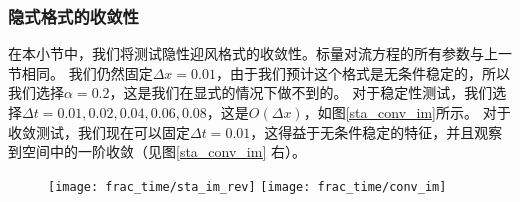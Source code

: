 \subsubsection{隐式格式的收敛性}

在本小节中，我们将测试隐性迎风格式的收敛性。标量对流方程的所有参数与上一节相同。 我们仍然固定$ \Delta x = 0.01 $，由于我们预计这个格式是无条件稳定的，所以我们选择$ \alpha = 0.2 $，这是我们在显式的情况下做不到的。 对于稳定性测试，我们选择$ \Delta t = 0.01,0.02,0.04,0.06,0.08 $，这是$ O(\Delta x)$，如图\ref {sta_conv_im}所示。 对于收敛测试，我们现在可以固定$ \Delta t = 0.01 $，这得益于无条件稳定的特征，并且观察到空间中的一阶收敛（见图\ref{sta_conv_im} 右）。

\begin{figure}[htbp]
	\texttt{[image: frac\_time/sta\_im\_rev]}
	\texttt{[image: frac\_time/conv\_im]}
\end{figure}

